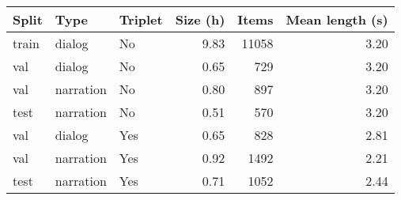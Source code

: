 \begin{tabular}{lllrrr}
\toprule
Split &      Type & Triplet &  Size (h) &  Items &  Mean length (s) \\
\midrule
train &    dialog &      No &      9.83 &  11058 &             3.20 \\
  val &    dialog &      No &      0.65 &    729 &             3.20 \\
  val & narration &      No &      0.80 &    897 &             3.20 \\
 test & narration &      No &      0.51 &    570 &             3.20 \\
  val &    dialog &     Yes &      0.65 &    828 &             2.81 \\
  val & narration &     Yes &      0.92 &   1492 &             2.21 \\
 test & narration &     Yes &      0.71 &   1052 &             2.44 \\
\bottomrule
\end{tabular}
